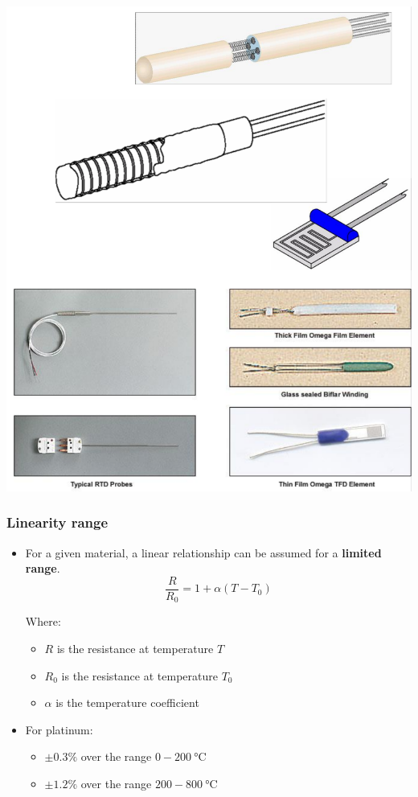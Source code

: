 \documentclass[11pt]{article}
\begin{document}
\begin{center}
\includegraphics[width=.9\linewidth]{./images/resistance-temperature-detectors.png}
\end{center}
\subsubsection{Linearity range}
\label{sec:org190aad2}
\begin{itemize}
\item For a given material, a linear relationship can be assumed for a \textbf{limited range}.
\[\frac{R}{R_0} = 1 + \alpha (T - T_0)\]

Where:
\begin{itemize}
\item \(R\) is the resistance at temperature \(T\)
\item \(R_0\) is the resistance at temperature \(T_0\)
\item \(\alpha\) is the temperature coefficient
\end{itemize}

\item For platinum:
\begin{itemize}
\item \(\pm 0.3\%\) over the range \(0 - \qty{200}{\degreeCelsius}\)
\item \(\pm 1.2\%\) over the range \(200 - \qty{800}{\degreeCelsius}\)
\end{itemize}
\end{itemize}
\end{document}
